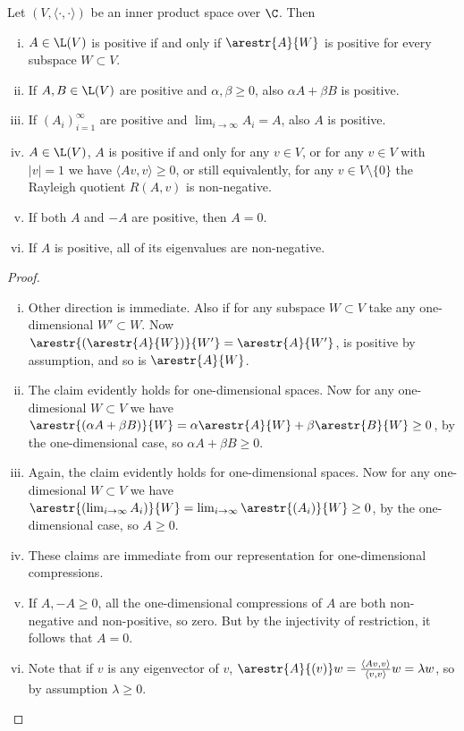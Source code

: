 \begin{prop}
	Let $(V, \langle \cdot, \cdot \rangle)$ be an inner product space over $\C$. Then
	\begin{enumerate}[(i)]
		\item $A \in \L(V)$ is positive if and only if $\arestr{A}{W}$ is positive for every subspace $W \subset V$.
		\item If $A, B \in \L(V)$ are positive and $\alpha, \beta \geq 0$, also $\alpha A + \beta B$ is positive.
		\item If $(A_{i})_{i = 1}^{\infty}$ are positive and $\lim_{i \to \infty} A_{i} = A$, also $A$ is positive.
		\item $A \in \L(V)$, $A$ is positive if and only for any $v \in V$, or for any $v \in V$ with $|v| = 1$ we have $\langle A v, v \rangle \geq 0$, or still equivalently, for any $v \in V \setminus \{0\}$ the Rayleigh quotient $R(A, v)$ is non-negative.
		\item If both $A$ and $-A$ are positive, then $A = 0$.
		\item If $A$ is positive, all of its eigenvalues are non-negative.
	\end{enumerate}
\end{prop}
\begin{proof}
	\begin{enumerate}[(i)]
		\item Other direction is immediate. Also if for any subspace $W \subset V$ take any one-dimensional $W' \subset W$. Now $\arestr{(\arestr{A}{W})}{W'} = \arestr{A}{W'}$, is positive by assumption, and so is $\arestr{A}{W}$.
		\item The claim evidently holds for one-dimensional spaces. Now for any one-dimesional $W \subset V$ we have $\arestr{(\alpha A + \beta B)}{W} = \alpha \arestr{A}{W} + \beta \arestr{B}{W} \geq 0$, by the one-dimensional case, so $\alpha A + \beta B \geq 0$.
		\item Again, the claim evidently holds for one-dimensional spaces. Now for any one-dimesional $W \subset V$ we have $\arestr{(\lim_{i \to \infty} A_{i})}{W} = \lim_{i \to \infty}\arestr{(A_{i})}{W}\geq 0$, by the one-dimensional case, so $A \geq 0$.
		\item These claims are immediate from our representation for one-dimensional compressions.
		\item If $A, -A \geq 0$, all the one-dimensional compressions of $A$ are both non-negative and non-positive, so zero. But by the injectivity of restriction, it follows that $A = 0$.
		\item Note that if $v$ is any eigenvector of $v$, $\arestr{A}{(v)} w = \frac{\langle A v, v\rangle}{\langle v, v\rangle} w = \lambda w$, so by assumption $\lambda \geq 0$.
	\end{enumerate}
\end{proof}

